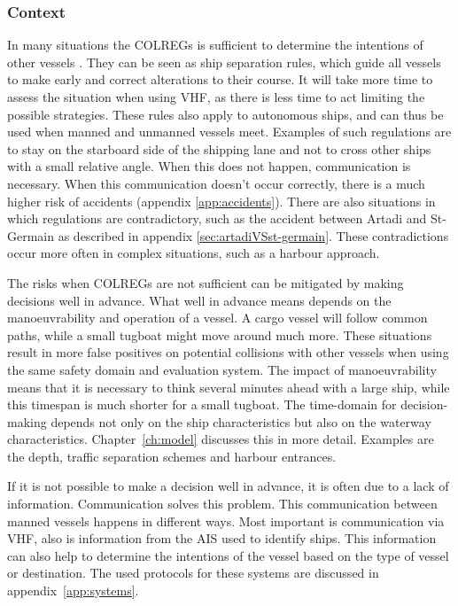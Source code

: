 \subsubsection*{Context}
In many situations the \acf{COLREGs} is sufficient to determine the intentions of other vessels \cite{IMO1972}. They can be seen as ship separation rules, which guide all vessels to make early and correct alterations to their course. It will take more time to assess the situation when using \ac{VHF}, as there is less time to act limiting the possible strategies. These rules also apply to autonomous ships, and can thus be used when manned and unmanned vessels meet.
Examples of such regulations are to stay on the starboard side of the shipping lane and not to cross other ships with a small relative angle. When this does not happen, communication is necessary. When this communication doesn't occur correctly, there is a much higher risk of accidents (appendix \ref{app:accidents}). There are also situations in which regulations are contradictory, such as the accident between Artadi and St-Germain as described in appendix \ref{sec:artadiVSst-germain}. These contradictions occur more often in complex situations, such as a harbour approach.

The risks when \ac{COLREGs} are not sufficient can be mitigated by making decisions well in advance. What well in advance means depends on the manoeuvrability and operation of a vessel. A cargo vessel will follow common paths, while a small tugboat might move around much more. These situations result in more false positives on potential collisions with other vessels when using the same safety domain and evaluation system. The impact of manoeuvrability means that it is necessary to think several minutes ahead with a large ship, while this timespan is much shorter for a small tugboat. The time-domain for decision-making depends not only on the ship characteristics but also on the waterway characteristics. Chapter~\ref{ch:model} discusses this in more detail. Examples are the depth, traffic separation schemes and harbour entrances.

If it is not possible to make a decision well in advance, it is often due to a lack of information. Communication solves this problem. This communication between manned vessels happens in different ways. Most important is communication via \ac{VHF}, also is information from the AIS used to identify ships. This information can also help to determine the intentions of the vessel based on the type of vessel or destination. The used protocols for these systems are discussed in appendix~\ref{app:systems}.

